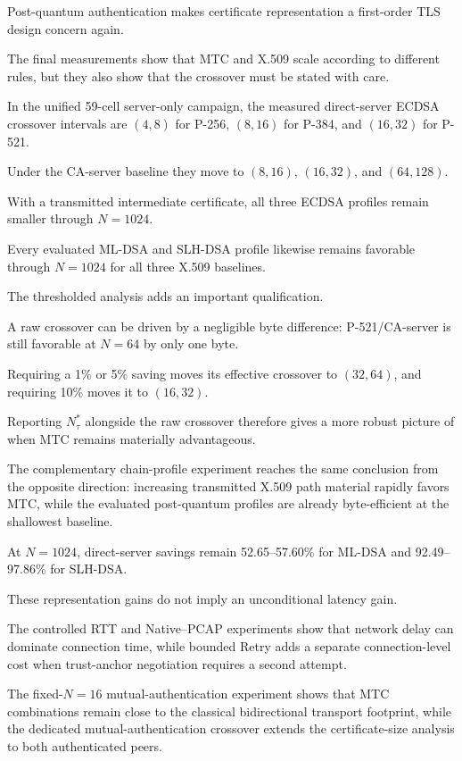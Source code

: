 \documentclass[journal]{IEEEtran}
\begin{document}
Post-quantum authentication makes certificate representation a first-order TLS design concern again.

The final measurements show that MTC and X.509 scale according to different rules, but they also show that the crossover must be stated with care.



In the unified 59-cell server-only campaign, the measured direct-server ECDSA crossover intervals are $(4,8)$ for P-256, $(8,16)$ for P-384, and $(16,32)$ for P-521.

Under the CA-server baseline they move to $(8,16)$, $(16,32)$, and $(64,128)$.

With a transmitted intermediate certificate, all three ECDSA profiles remain smaller through $N=1024$.

Every evaluated ML-DSA and SLH-DSA profile likewise remains favorable through $N=1024$ for all three X.509 baselines.



The thresholded analysis adds an important qualification.

A raw crossover can be driven by a negligible byte difference: P-521/CA-server is still favorable at $N=64$ by only one byte.

Requiring a 1\% or 5\% saving moves its effective crossover to $(32,64)$, and requiring 10\% moves it to $(16,32)$.

Reporting $N^*_{\tau}$ alongside the raw crossover therefore gives a more robust picture of when MTC remains materially advantageous.



The complementary chain-profile experiment reaches the same conclusion from the opposite direction: increasing transmitted X.509 path material rapidly favors MTC, while the evaluated post-quantum profiles are already byte-efficient at the shallowest baseline.

At $N=1024$, direct-server savings remain 52.65--57.60\% for ML-DSA and 92.49--97.86\% for SLH-DSA.



These representation gains do not imply an unconditional latency gain.

The controlled RTT and Native--PCAP experiments show that network delay can dominate connection time, while bounded Retry adds a separate connection-level cost when trust-anchor negotiation requires a second attempt.

The fixed-$N=16$ mutual-authentication experiment shows that MTC combinations remain close to the classical bidirectional transport footprint, while the dedicated mutual-authentication crossover extends the certificate-size analysis to both authenticated peers.
\end{document}
